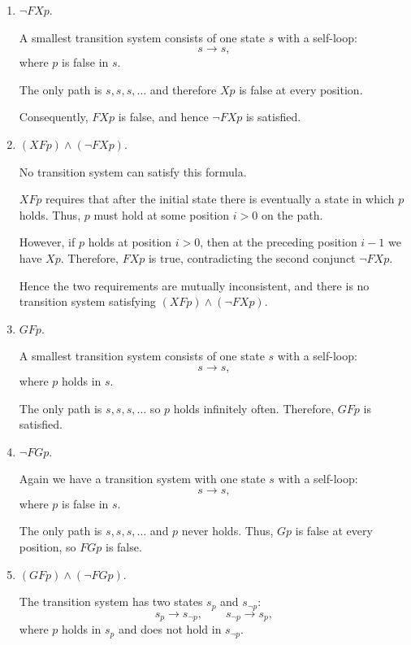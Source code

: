\documentclass[12pt,a4paper]{article}
\begin{document}
\begin{description}
\begin{enumerate}[label=\alph*)]
The only path is
$ s_0,s_1,s_1,s_1,\ldots $
and after one step from the initial state $p$ eventually holds. Hence $X F p$ is satisfied.
\color{black}
\fi
%
\item $\neg F X p$.
%
\ifwithanswers
\color{blue}
\par
A smallest transition system consists of one state $s$ with a self-loop:
\[
s \longrightarrow s,
\]
where $p$ is false in $s$.

The only path is $ s,s,s,\ldots $ and therefore $Xp$ is false at every position. 

Consequently, $F Xp$ is false, and hence $ \neg F Xp $ is satisfied.
\color{black}
\fi
%
\item $(X F p) \wedge (\neg F X p) $.
%
\ifwithanswers
\color{blue}
\par

No transition system can satisfy this formula.

$ XFp $ requires that after the initial state there is eventually a state in which $p$ holds. Thus, $p$ must hold at some position $i>0$ on the path.

However, if $p$ holds at position $i>0$, then at the preceding position $i-1$ we have $Xp.$
Therefore, $FXp$ is true, contradicting the second conjunct $\neg FXp.$

Hence the two requirements are mutually inconsistent, and there is no transition system satisfying $ (XFp)\wedge(\neg FXp). $

\color{black}
\fi
%
\item $G F p$.
%
\ifwithanswers
\color{blue}
\par
A smallest transition system consists of one state $s$ with a self-loop:
\[
s \longrightarrow s,
\]
where $p$ holds in $s$.

The only path is $ s,s,s,\ldots $ so $p$ holds infinitely often. Therefore, $ GFp $ is satisfied.
\color{black}
\fi
%
\item $\neg F G p$.
%
\ifwithanswers
\color{blue}
\par
Again we have a transition system with one state $s$ with a self-loop:
\[
s \longrightarrow s,
\]
where $p$ is false in $s$.

The only path is $ s,s,s,\ldots $ and $p$ never holds. Thus, $Gp$ is false at every position, so $FGp$ is false. 
\color{black}
\fi
%
\item $(G F p) \wedge (\neg F G p)$.
%
\ifwithanswers
\color{blue}
\par
The transition system has two states $s_p$ and $s_{\neg p}$:
\[
s_p \longrightarrow s_{\neg p},
\qquad
s_{\neg p} \longrightarrow s_p,
\]
where $p$ holds in $s_p$ and does not hold in $s_{\neg p}$.


\end{enumerate}
\end{description}
\end{document}

